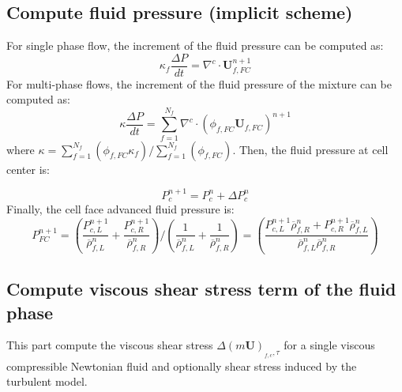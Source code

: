 \documentclass[preprint,12pt]{elsarticle}
\begin{document}
\subsection{\textsf{Compute fluid pressure (implicit scheme)}}
For single phase flow, the increment of the fluid pressure can be computed as:
%
\begin{equation}
  \kappa_f \frac{\Delta P}{dt} = \nabla^c \cdot \pmb{U}_{f,FC}^{n+1}
\end {equation}
%
For multi-phase flows, the increment of the fluid pressure of the mixture can be computed as:
%
\begin{equation}
  \kappa \frac{\Delta P}{dt} = \sum_{f=1}^{N_f}  \nabla^c \cdot (\phi_{f,FC} \pmb{U}_{f,FC})^{n+1}
\end {equation}
%
where $\kappa =  \sum_{f=1}^{N_f}  (\phi_{f,FC} \kappa_f) / \sum_{f=1}^{N_f}  (\phi_{f,FC})$. Then, the fluid pressure at cell center is:

\begin{equation}
  P_c^{n+1} =  P_c^{n} + \Delta P_c^{n}
\end {equation}
%
%
%
%
%
%
%
%
Finally, the cell face advanced fluid pressure is:
%
%
\begin{equation}
    P_{FC}^{n+1} = (\frac{P_{c,L}^{n+1}}{\overline{\rho}_{f,L}^n} + \frac{P_{c,R}^{n+1}}{\overline{\rho}_{f,R}^n}) / (\frac{1}{\overline{\rho}_{f,L}^n} + \frac{1}{\overline{\rho}_{f,R}^n}) = (\frac{P_{c,L}^{n+1} \overline{\rho}_{f,R}^n + P_{c,R}^{n+1} \overline{\rho}_{f,L}^n}{\overline{\rho}_{f,L}^n \overline{\rho}_{f,R}^n})
\end {equation}
%
%
\subsection{\textsf{Compute viscous shear stress term of the fluid phase}}
This part compute the viscous shear stress $\Delta (m \pmb{U})_{_{f,c},\tau}$ for a single viscous compressible Newtonian fluid and optionally shear stress induced by the turbulent model.
%
%
\end{document}
